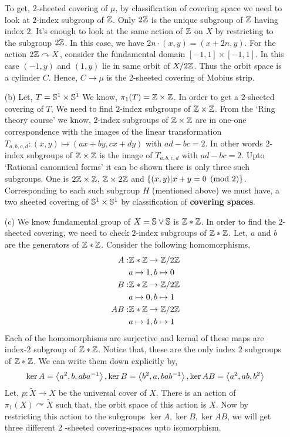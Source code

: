 \documentclass[11pt]{article}
\begin{document}
\begin{itemize}
    \vspace*{0.2cm}

    \noindent To get, $2$-sheeted covering of $\mu$, by classification of covering space we need to look at $2$-index subgroup of $\mathbb{Z}$. Only $2\mathbb{Z}$ is the unique subgroup of $\mathbb{Z}$ having index $2$. It's enough to look at the same action of $\mathbb{Z}$ on $X$ by restricting to the subgroup $2\mathbb{Z}$. In this case, we have $2n \cdot (x,y) = (x+2n,y)$. For the action $2\mathbb{Z} \curvearrowright X$, consider the fundamental domain $[-1,1]\times [-1,1]$. In this case $(-1,y)$ and $(1,y)$ lie in same orbit of $X/2\mathbb{Z}$. Thus the orbit space is a cylinder $C$. Hence, $C \to \mu$ is the $2$-sheeted covering of Mobius strip. 
    
    \item[(b)] Let, $T = \mathbb{S}^1 \times \mathbb{S}^1$ We know, $\pi_1(T)=\mathbb{Z} \times \mathbb{Z}$. In order to get a $2$-sheeted covering of $T$, We need to find $2$-index subgroups of $\mathbb{Z} \times \mathbb{Z}$. From the `Ring theory course' we know, $2$-index subgroups of $\mathbb{Z} \times \mathbb{Z}$ are in one-one correspondence with the images of the linear transformation $T_{a,b,c,d} : (x,y) \mapsto (ax+by,cx+dy)$ with $ad -bc =2$. In other words $2$-index subgroups of $\mathbb{Z} \times \mathbb{Z}$ is the image of $T_{a,b,c,d}$ with $ad-bc=2$. Upto `Rational canonnical forms' it can be shown there is only three such subgroups. One is $2\mathbb{Z} \times \mathbb{Z}$, $\mathbb{Z} \times 2\mathbb{Z}$ and $\qty{(x,y)| x+y = 0 \pmod{2}}$. Corresponding to each such subgroup $H$ (mentioned above) we must have, a two sheeted covering of $\mathbb{S}^1 \times \mathbb{S}^1$ by classification of \textbf{\textsf{covering spaces}}. 
    

    \item[(c)] We know fundamental group of $X=\mathbb{S} \vee \mathbb{S}$ is $\mathbb{Z} \ast \mathbb{Z}$. In order to find the $2$-sheeted covering, we need to check $2$-index subgroups of $\mathbb{Z} \ast \mathbb{Z}$. Let, $a$ and $b$ are the generators of $\mathbb{Z} \ast \mathbb{Z}$.  Consider the following homomorphisms, \begin{align*}
        A:& \mathbb{Z} \ast \mathbb{Z} \to \mathbb{Z}/2\mathbb{Z} \\
          & a \mapsto 1, b \mapsto 0 \\
        B:&  \mathbb{Z} \ast \mathbb{Z} \to \mathbb{Z}/2\mathbb{Z}\\
          &  a \mapsto 0, b \mapsto 1 \\
        AB:&  \mathbb{Z} \ast \mathbb{Z} \to \mathbb{Z}/2\mathbb{Z}\\
           &   a \mapsto 1, b \mapsto 1 \\
    \end{align*}  
    Each of the homomorphisms are surjective and kernal of these maps are index-$2$ subgroup of $\mathbb{Z} \ast \mathbb{Z}$. Notice that, these are the only index $2$ subgroups of $\mathbb{Z} \ast \mathbb{Z}$. We can write them down explicitly by, $$\ker A = \left\langle {a^2}, {b,aba^{-1}} \right\rangle, \ker B = \left\langle {b^2}, {a,bab^{-1}} \right\rangle, \ker AB = \left\langle {a^2}, {ab,b^2} \right\rangle$$
    Let, $p:\tilde{X} \to X$ be the universal cover of $X$. There is an action of $\pi_1(X) \curvearrowright \tilde{X}$ such that, the orbit space of this action is $X$. Now by restricting this action to the subgroups $\ker A,\ker B,\ker AB$, we will get three different $2$ -sheeted covering-spaces upto isomorphism. 

\end{itemize}
\end{document}
